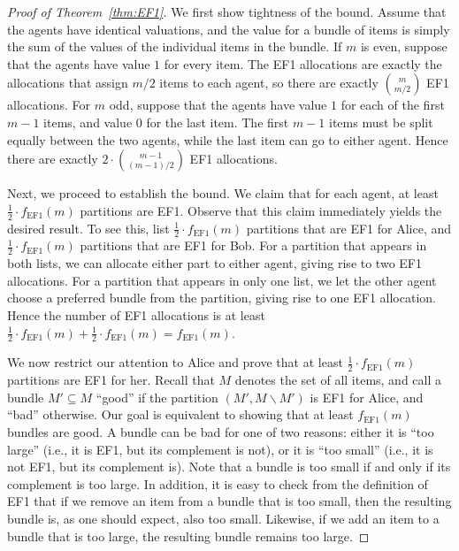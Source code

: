 \documentclass[11pt]{scrartcl}
\theoremstyle{definition}
\begin{document}
\begin{proof}[Proof of Theorem~\ref{thm:EF1}]
We first show tightness of the bound. 
Assume that the agents have identical valuations, and the value for a bundle of items is simply the sum of the values of the individual items in the bundle.
If $m$ is even, suppose that the agents have value $1$ for every item. 
The EF1 allocations are exactly the allocations that assign $m/2$ items to each agent, so there are exactly $\binom{m}{m/2}$ EF1 allocations.
For $m$ odd, suppose that the agents have value $1$ for each of the first $m-1$ items, and value $0$ for the last item.
The first $m-1$ items must be split equally between the two agents, while the last item can go to either agent.
Hence there are exactly $2\cdot\binom{m-1}{(m-1)/2}$ EF1 allocations.

Next, we proceed to establish the bound.
We claim that for each agent, at least $\frac{1}{2}\cdot f_{\text{EF1}}(m)$ partitions are EF1.
Observe that this claim immediately yields the desired result.
To see this, list $\frac{1}{2}\cdot f_{\text{EF1}}(m)$ partitions that are EF1 for Alice, and $\frac{1}{2}\cdot f_{\text{EF1}}(m)$ partitions that are EF1 for Bob.
For a partition that appears in both lists, we can allocate either part to either agent, giving rise to two EF1 allocations.
For a partition that appears in only one list, we let the other agent choose a preferred bundle from the partition, giving rise to one EF1 allocation.
Hence the number of EF1 allocations is at least $\frac{1}{2}\cdot f_{\text{EF1}}(m) + \frac{1}{2}\cdot f_{\text{EF1}}(m) = f_{\text{EF1}}(m)$.

We now restrict our attention to Alice and prove that at least $\frac{1}{2}\cdot f_{\text{EF1}}(m)$ partitions are EF1 for her.
Recall that $M$ denotes the set of all items, and call a bundle $M'\subseteq M$ ``good'' if the partition $(M',M\backslash M')$ is EF1 for Alice, and ``bad'' otherwise.
Our goal is equivalent to showing that at least $f_{\text{EF1}}(m)$ bundles are good.
A bundle can be bad for one of two reasons: either it is ``too large'' (i.e., it is EF1, but its complement is not), or it is ``too small'' (i.e., it is not EF1, but its complement is).
Note that a bundle is too small if and only if its complement is too large.
In addition, it is easy to check from the definition of EF1 that if we remove an item from a bundle that is too small, then the resulting bundle is, as one should expect, also too small.
Likewise, if we add an item to a bundle that is too large, the resulting bundle remains too large.


\end{proof}
\end{document}

